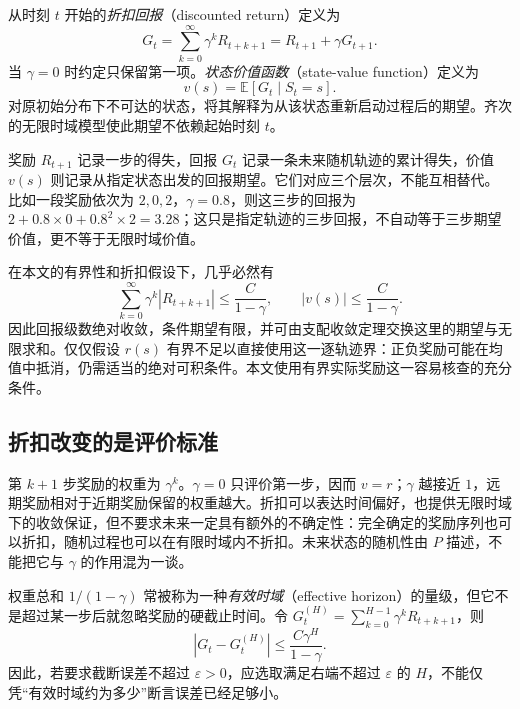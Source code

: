 \documentclass[UTF8,12pt,a4paper,fontset=fandol]{ctexart}
\begin{document}
\begin{definition}[折扣回报与状态价值]
从时刻 $t$ 开始的\emph{折扣回报}（discounted return）定义为
\begin{equation}
  G_t=\sum_{k=0}^{\infty}\gamma^kR_{t+k+1}
     =R_{t+1}+\gamma G_{t+1}.
  \label{eq:mrp-return}
\end{equation}
当 $\gamma=0$ 时约定只保留第一项。\emph{状态价值函数}（state-value function）定义为
\begin{equation}
  v(s)=\mathbb E[G_t\mid S_t=s].
  \label{eq:mrp-value}
\end{equation}
对原初始分布下不可达的状态，将其解释为从该状态重新启动过程后的期望。齐次的无限时域模型使此期望不依赖起始时刻 $t$。
\end{definition}

奖励 $R_{t+1}$ 记录一步的得失，回报 $G_t$ 记录一条未来随机轨迹的累计得失，价值 $v(s)$ 则记录从指定状态出发的回报期望。它们对应三个层次，不能互相替代。比如一段奖励依次为 $2,0,2$，$\gamma=0.8$，则这三步的回报为 $2+0.8\times0+0.8^2\times2=3.28$；这只是指定轨迹的三步回报，不自动等于三步期望价值，更不等于无限时域价值。

在本文的有界性和折扣假设下，几乎必然有
\begin{equation}
  \sum_{k=0}^{\infty}\gamma^k|R_{t+k+1}|
  \leq \frac{C}{1-\gamma},\qquad
  |v(s)|\leq\frac{C}{1-\gamma}.
  \label{eq:mrp-return-bound}
\end{equation}
因此回报级数绝对收敛，条件期望有限，并可由支配收敛定理交换这里的期望与无限求和。仅仅假设 $r(s)$ 有界不足以直接使用这一逐轨迹界：正负奖励可能在均值中抵消，仍需适当的绝对可积条件。本文使用有界实际奖励这一容易核查的充分条件。

\subsection{折扣改变的是评价标准}

第 $k+1$ 步奖励的权重为 $\gamma^k$。$\gamma=0$ 只评价第一步，因而 $v=r$；$\gamma$ 越接近 $1$，远期奖励相对于近期奖励保留的权重越大。折扣可以表达时间偏好，也提供无限时域下的收敛保证，但不要求未来一定具有额外的不确定性：完全确定的奖励序列也可以折扣，随机过程也可以在有限时域内不折扣。未来状态的随机性由 $P$ 描述，不能把它与 $\gamma$ 的作用混为一谈。

权重总和 $1/(1-\gamma)$ 常被称为一种\emph{有效时域}（effective horizon）的量级，但它不是超过某一步后就忽略奖励的硬截止时间。令 $G_t^{(H)}=\sum_{k=0}^{H-1}\gamma^kR_{t+k+1}$，则
\begin{equation}
  |G_t-G_t^{(H)}|\leq\frac{C\gamma^H}{1-\gamma}.
  \label{eq:mrp-tail-bound}
\end{equation}
因此，若要求截断误差不超过 $\varepsilon>0$，应选取满足右端不超过 $\varepsilon$ 的 $H$，不能仅凭“有效时域约为多少”断言误差已经足够小。
\end{document}
